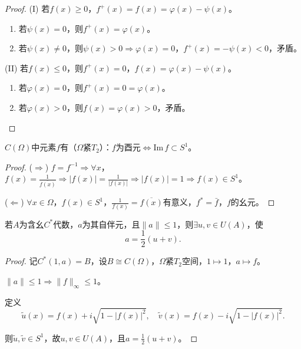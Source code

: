 \documentclass[lang=cn,a4paper,newtx,section]{elegantbook}
\begin{document}
\begin{proof}
  (I) 若$f(x) \geq 0$，$f^+(x) = f(x) = \varphi(x) - \psi(x)$。
  \begin{enumerate}
    \item 若$\psi(x) = 0$，则$f^+(x) = \varphi(x)$。
    \item 若$\psi(x) \neq 0$，则$\psi(x) > 0 \Rightarrow \varphi(x) = 0$，$f^+(x) = -\psi(x) < 0$，矛盾。
  \end{enumerate}
  
  (II) 若$f(x) \leq 0$，则$f^+(x) = 0$，$f(x) = \varphi(x) - \psi(x)$。
  \begin{enumerate}
    \item 若$\varphi(x) = 0$，则$f^+(x) = 0 = \varphi(x)$。
    \item 若$\varphi(x) > 0$，则$f(x) = \varphi(x) > 0$，矛盾。
  \end{enumerate}
\end{proof}

\begin{proposition}
  $C(\Omega)$中元素$f$有（$\Omega$紧$T_2$）：$f$为酉元$\Longleftrightarrow \mathrm{Im}\, f \subset S^1$。
\end{proposition}

\begin{proof}
  ($\Rightarrow$) $f = f^{-1} \Rightarrow \forall x$，$f(x) = \frac{1}{\overline{f(x)}} \Rightarrow |f(x)| = \frac{1}{|f(x)|} \Rightarrow |f(x)| = 1 \Rightarrow f(x) \in S^1$。
  
  ($\Leftarrow$) $\forall x \in \Omega$，$f(x) \in S^1$，$\frac{1}{f(x)} = \overline{f(x)}$有意义，$f^* = \bar{f}$，$f$的幺元。
\end{proof}

\begin{proposition}
  若$A$为含幺$C^*$代数，$a$为其自伴元，且$\|a\| \leq 1$，则$\exists u, v \in U(A)$，使
  \begin{equation*}
    a = \frac{1}{2}(u + v).
  \end{equation*}
\end{proposition}

\begin{proof}
  记$C^*(1, a) = B$，设$B \cong C(\Omega)$，$\Omega$紧$T_2$空间，$1 \mapsto 1$，$a \mapsto f$。
  
  $\|a\| \leq 1 \Rightarrow \|f\|_\infty \leq 1$。
  
  定义
  \begin{equation*}
    \tilde{u}(x) = f(x) + i\sqrt{1 - |f(x)|^2}, \quad \tilde{v}(x) = f(x) - i\sqrt{1 - |f(x)|^2}.
  \end{equation*}
  
  则$\tilde{u}, \tilde{v} \in S^1$，故$u, v \in U(A)$，且$a = \frac{1}{2}(u + v)$。
\end{proof}
\end{document}
